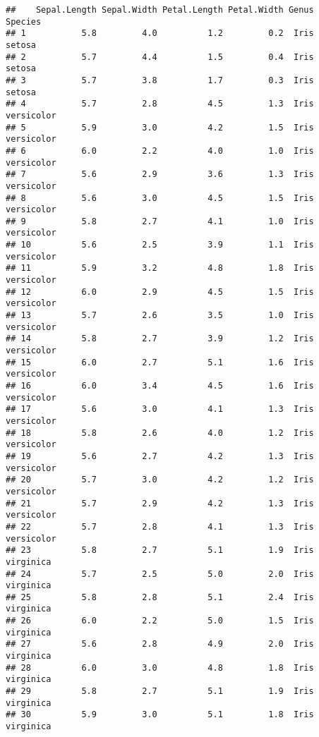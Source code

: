 \documentclass[
]{book}
\newenvironment{Shaded}{\begin{snugshade}}{\end{snugshade}}
\newcommand{\DataTypeTok}[1]{\textcolor[rgb]{0.13,0.29,0.53}{#1}}
\newcommand{\KeywordTok}[1]{\textcolor[rgb]{0.13,0.29,0.53}{\textbf{#1}}}
\newcommand{\NormalTok}[1]{#1}
\newcommand{\OperatorTok}[1]{\textcolor[rgb]{0.81,0.36,0.00}{\textbf{#1}}}
\newcommand{\StringTok}[1]{\textcolor[rgb]{0.31,0.60,0.02}{#1}}
\begin{document}
\begin{verbatim}
##    Sepal.Length Sepal.Width Petal.Length Petal.Width Genus    Species
## 1           5.8         4.0          1.2         0.2  Iris     setosa
## 2           5.7         4.4          1.5         0.4  Iris     setosa
## 3           5.7         3.8          1.7         0.3  Iris     setosa
## 4           5.7         2.8          4.5         1.3  Iris versicolor
## 5           5.9         3.0          4.2         1.5  Iris versicolor
## 6           6.0         2.2          4.0         1.0  Iris versicolor
## 7           5.6         2.9          3.6         1.3  Iris versicolor
## 8           5.6         3.0          4.5         1.5  Iris versicolor
## 9           5.8         2.7          4.1         1.0  Iris versicolor
## 10          5.6         2.5          3.9         1.1  Iris versicolor
## 11          5.9         3.2          4.8         1.8  Iris versicolor
## 12          6.0         2.9          4.5         1.5  Iris versicolor
## 13          5.7         2.6          3.5         1.0  Iris versicolor
## 14          5.8         2.7          3.9         1.2  Iris versicolor
## 15          6.0         2.7          5.1         1.6  Iris versicolor
## 16          6.0         3.4          4.5         1.6  Iris versicolor
## 17          5.6         3.0          4.1         1.3  Iris versicolor
## 18          5.8         2.6          4.0         1.2  Iris versicolor
## 19          5.6         2.7          4.2         1.3  Iris versicolor
## 20          5.7         3.0          4.2         1.2  Iris versicolor
## 21          5.7         2.9          4.2         1.3  Iris versicolor
## 22          5.7         2.8          4.1         1.3  Iris versicolor
## 23          5.8         2.7          5.1         1.9  Iris  virginica
## 24          5.7         2.5          5.0         2.0  Iris  virginica
## 25          5.8         2.8          5.1         2.4  Iris  virginica
## 26          6.0         2.2          5.0         1.5  Iris  virginica
## 27          5.6         2.8          4.9         2.0  Iris  virginica
## 28          6.0         3.0          4.8         1.8  Iris  virginica
## 29          5.8         2.7          5.1         1.9  Iris  virginica
## 30          5.9         3.0          5.1         1.8  Iris  virginica
\end{verbatim}

\begin{Shaded}
\end{Shaded}
\end{document}
